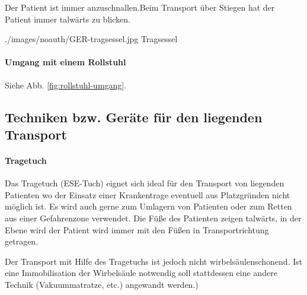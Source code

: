 {
Der Patient ist immer anzuschnallen.Beim Transport über
Stiegen hat der Patient immer talwärts zu blicken.

{\TakeNotesLarge}
}{

}
{./images/noauth/GER-tragsessel.jpg}
{Tragsessel}
{}


\paragraph{Umgang mit einem Rollstuhl}

Siehe Abb. \ref{fig:rollstuhl-umgang}.

{\TakeNotesLarge}


\subsection{Techniken bzw. Geräte für den liegenden Transport}

\paragraph{Tragetuch}

Das Tragetuch (ESE-Tuch) eignet sich ideal für den Transport
von liegenden Patienten wo der Einsatz einer Krankentrage
eventuell aus Platzgründen nicht möglich ist. Es wird auch
gerne zum Umlagern von Patienten oder zum Retten aus einer
Gefahrenzone verwendet. Die Füße des Patienten zeigen
talwärts, in der Ebene wird der Patient wird immer mit den
Füßen in Transportrichtung getragen.

Der Transport mit Hilfe des Tragetuchs ist jedoch nicht
wirbelsäulenschonend. Ist eine Immobilisation der
Wirbelsäule notwendig soll stattdessen eine andere Technik
(Vakuummatratze, etc.) angewandt werden.)

